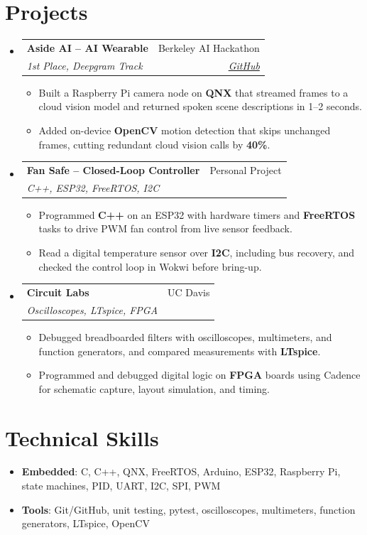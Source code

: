 \documentclass[letterpaper,10pt]{article}
\makeatletter
\newcommand{\resumeItem}[1]{\item\small #1}
\newcommand{\resumeSubheading}[4]{
  \vspace{3pt}\item
    \begin{tabular*}{0.97\textwidth}[t]{l@{\extracolsep{\fill}}r}
      \textbf{\normalsize #1} & \normalsize #2 \\
      \textit{\small #3} & \textit{\small #4} \\
    \end{tabular*}\vspace{-3pt}
}
\newcommand{\resumeSubHeadingListStart}{\begin{itemize}[leftmargin=0.15in, label={}, itemsep=0pt, topsep=0pt]}
\newcommand{\resumeSubHeadingListEnd}{\end{itemize}}
\newcommand{\resumeItemListStart}{\begin{itemize}[label=\textbullet, leftmargin=0.18in, itemsep=1pt, parsep=0pt, topsep=1.5pt]}
\newcommand{\resumeItemListEnd}{\end{itemize}}
\makeatother
\begin{document}
\section{Projects}
  \resumeSubHeadingListStart
    \resumeSubheading
      {Aside AI -- AI Wearable}{Berkeley AI Hackathon}
      {1st Place, Deepgram Track}{\href{https://github.com/Da0t/AsideAI}{GitHub}}
      \resumeItemListStart
        \resumeItem{Built a Raspberry Pi camera node on \textbf{QNX} that streamed frames to a cloud vision model and returned spoken scene descriptions in 1--2 seconds.}
        \resumeItem{Added on-device \textbf{OpenCV} motion detection that skips unchanged frames, cutting redundant cloud vision calls by \textbf{40\%}.}
      \resumeItemListEnd
    \resumeSubheading
      {Fan Safe -- Closed-Loop Controller}{Personal Project}
      {C++, ESP32, FreeRTOS, I2C}{}
      \resumeItemListStart
        \resumeItem{Programmed \textbf{C++} on an ESP32 with hardware timers and \textbf{FreeRTOS} tasks to drive PWM fan control from live sensor feedback.}
        \resumeItem{Read a digital temperature sensor over \textbf{I2C}, including bus recovery, and checked the control loop in Wokwi before bring-up.}
      \resumeItemListEnd
    \resumeSubheading
      {Circuit Labs}{UC Davis}
      {Oscilloscopes, LTspice, FPGA}{}
      \resumeItemListStart
        \resumeItem{Debugged breadboarded filters with oscilloscopes, multimeters, and function generators, and compared measurements with \textbf{LTspice}.}
        \resumeItem{Programmed and debugged digital logic on \textbf{FPGA} boards using Cadence for schematic capture, layout simulation, and timing.}
      \resumeItemListEnd
  \resumeSubHeadingListEnd
\section{Technical Skills}
  \begin{itemize}[leftmargin=0.15in, label={}, itemsep=1pt, topsep=2pt]
    \small
    \item \textbf{Embedded}: C, C++, QNX, FreeRTOS, Arduino, ESP32, Raspberry Pi, state machines, PID, UART, I2C, SPI, PWM
    \item \textbf{Tools}: Git/GitHub, unit testing, pytest, oscilloscopes, multimeters, function generators, LTspice, OpenCV
  \end{itemize}
\end{document}
